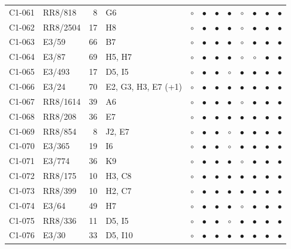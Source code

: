 {\begin{longtable}{llrp{3.9cm}cccccccc}
    C1-061 & RR8/818 & 8 & G6 & $\circ$ & $\bullet$ & $\bullet$ & $\bullet$ & $\circ$ & $\bullet$ & $\bullet$ & $\bullet$ \\
    C1-062 & RR8/2504 & 17 & H8 & $\circ$ & $\bullet$ & $\bullet$ & $\bullet$ & $\circ$ & $\bullet$ & $\bullet$ & $\bullet$ \\
    C1-063 & E3/59 & 66 & B7 & $\circ$ & $\bullet$ & $\bullet$ & $\bullet$ & $\circ$ & $\bullet$ & $\bullet$ & $\bullet$ \\
    C1-064 & E3/87 & 69 & H5, H7 & $\circ$ & $\bullet$ & $\bullet$ & $\bullet$ & $\circ$ & $\circ$ & $\bullet$ & $\bullet$ \\
    C1-065 & E3/493 & 17 & D5, I5 & $\circ$ & $\bullet$ & $\bullet$ & $\circ$ & $\bullet$ & $\bullet$ & $\bullet$ & $\bullet$ \\
    C1-066 & E3/24 & 70 & E2, G3, H3, E7 (+1) & $\circ$ & $\bullet$ & $\bullet$ & $\bullet$ & $\bullet$ & $\bullet$ & $\bullet$ & $\bullet$ \\
    C1-067 & RR8/1614 & 39 & A6 & $\circ$ & $\bullet$ & $\bullet$ & $\bullet$ & $\circ$ & $\bullet$ & $\bullet$ & $\bullet$ \\
    C1-068 & RR8/208 & 36 & E7 & $\circ$ & $\bullet$ & $\bullet$ & $\bullet$ & $\bullet$ & $\bullet$ & $\bullet$ & $\bullet$ \\
    C1-069 & RR8/854 & 8 & J2, E7 & $\circ$ & $\bullet$ & $\bullet$ & $\circ$ & $\bullet$ & $\bullet$ & $\bullet$ & $\bullet$ \\
    C1-070 & E3/365 & 19 & I6 & $\circ$ & $\bullet$ & $\bullet$ & $\circ$ & $\bullet$ & $\bullet$ & $\bullet$ & $\bullet$ \\
    C1-071 & E3/774 & 36 & K9 & $\circ$ & $\bullet$ & $\bullet$ & $\bullet$ & $\circ$ & $\bullet$ & $\bullet$ & $\bullet$ \\
    C1-072 & RR8/175 & 10 & H3, C8 & $\circ$ & $\bullet$ & $\bullet$ & $\bullet$ & $\bullet$ & $\bullet$ & $\bullet$ & $\bullet$ \\
    C1-073 & RR8/399 & 10 & H2, C7 & $\circ$ & $\bullet$ & $\bullet$ & $\bullet$ & $\bullet$ & $\bullet$ & $\bullet$ & $\bullet$ \\
    C1-074 & E3/64 & 49 & H7 & $\circ$ & $\bullet$ & $\bullet$ & $\bullet$ & $\circ$ & $\bullet$ & $\bullet$ & $\bullet$ \\
    C1-075 & RR8/336 & 11 & D5, I5 & $\circ$ & $\bullet$ & $\bullet$ & $\circ$ & $\bullet$ & $\bullet$ & $\bullet$ & $\bullet$ \\
    C1-076 & E3/30 & 33 & D5, I10 & $\circ$ & $\bullet$ & $\bullet$ & $\bullet$ & $\bullet$ & $\bullet$ & $\bullet$ & $\bullet$ \\

\end{longtable}}
